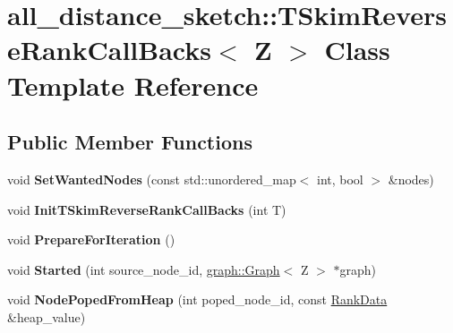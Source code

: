 \hypertarget{classall__distance__sketch_1_1TSkimReverseRankCallBacks}{}\section{all\+\_\+distance\+\_\+sketch\+:\+:T\+Skim\+Reverse\+Rank\+Call\+Backs$<$ Z $>$ Class Template Reference}
\label{classall__distance__sketch_1_1TSkimReverseRankCallBacks}
\subsection*{Public Member Functions}
\begin{DoxyCompactItemize}
\item 
\hypertarget{classall__distance__sketch_1_1TSkimReverseRankCallBacks_ad95d62ff009ecdccf3bffef29b959c3a}{}void {\bfseries Set\+Wanted\+Nodes} (const std\+::unordered\+\_\+map$<$ int, bool $>$ \&nodes)\label{classall__distance__sketch_1_1TSkimReverseRankCallBacks_ad95d62ff009ecdccf3bffef29b959c3a}

\item 
\hypertarget{classall__distance__sketch_1_1TSkimReverseRankCallBacks_a7138a4838b8f358dc502973595c7ed42}{}void {\bfseries Init\+T\+Skim\+Reverse\+Rank\+Call\+Backs} (int T)\label{classall__distance__sketch_1_1TSkimReverseRankCallBacks_a7138a4838b8f358dc502973595c7ed42}

\item 
\hypertarget{classall__distance__sketch_1_1TSkimReverseRankCallBacks_a1ea4a914c9b78a6dd0ebce45ca28a347}{}void {\bfseries Prepare\+For\+Iteration} ()\label{classall__distance__sketch_1_1TSkimReverseRankCallBacks_a1ea4a914c9b78a6dd0ebce45ca28a347}

\item 
\hypertarget{classall__distance__sketch_1_1TSkimReverseRankCallBacks_a87070a17caa2fa3bcc66b77b862bdb1e}{}void {\bfseries Started} (int source\+\_\+node\+\_\+id, \hyperlink{classall__distance__sketch_1_1graph_1_1Graph}{graph\+::\+Graph}$<$ Z $>$ $\ast$graph)\label{classall__distance__sketch_1_1TSkimReverseRankCallBacks_a87070a17caa2fa3bcc66b77b862bdb1e}

\item 
\hypertarget{classall__distance__sketch_1_1TSkimReverseRankCallBacks_a3c767b0b691f003d4f5736de9a776e68}{}void {\bfseries Node\+Poped\+From\+Heap} (int poped\+\_\+node\+\_\+id, const \hyperlink{structall__distance__sketch_1_1RankData}{Rank\+Data} \&heap\+\_\+value)\label{classall__distance__sketch_1_1TSkimReverseRankCallBacks_a3c767b0b691f003d4f5736de9a776e68}


\end{DoxyCompactItemize}
